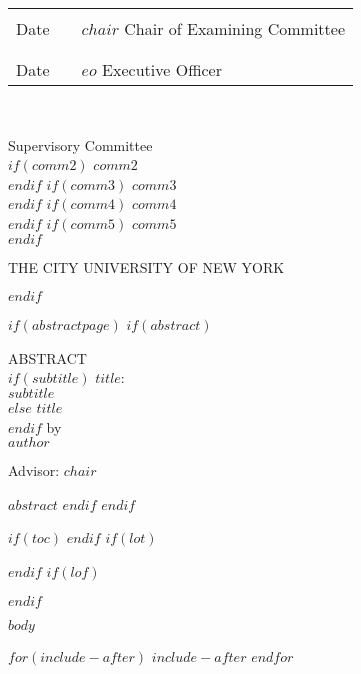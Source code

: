 \documentclass[$if(draft)$$draft$,$endif$$if(fontsize)$$fontsize$,$endif$$if(lang)$$babel-lang$,$endif$$if(papersize)$$papersize$,$endif$$if(sides)$$sides$,$endif$$for(classoption)$$classoption$$sep$,$endfor$]{$documentclass$}
\newcounter{savepage}
\begin{document}
\vspace{0.75in}

\setlength{\tabcolsep}{0pt}
\hspace*{-0.5in}
\doublespacing
\begin{tabular}[t]{p{1.75in}p{1.0in}p{3.5in}}
\hrulefill& &\hrulefill \\
Date & & $chair$ \newline Chair of Examining Committee\\
\\
\hrulefill& &\hrulefill \\
Date & & $eo$ \newline Executive Officer\\
\end{tabular}\\[0.5in]

\begin{center}
\doublespacing
Supervisory Committee \\
$if(comm2)$
  $comm2$ \\
$endif$
$if(comm3)$
  $comm3$ \\
$endif$
$if(comm4)$
  $comm4$ \\
$endif$
$if(comm5)$
  $comm5$ \\
$endif$

\vspace{\fill}
\uppercase{The City University of New York}
\end{center}
$endif$

$if(abstractpage)$
$if(abstract)$
\newpage
{}
\label{chap:abstract}
\begin{center}%
  \singlespacing
  ABSTRACT \\[2em]
  $if(subtitle)$
  $title$:\\
  $subtitle$\\[1em]
  $else$
  $title$\\[1em]
  $endif$
  by \\[1em]
  $author$ \\[0.25in]
\end{center}
\vspace{0.25in}
\noindent Advisor: $chair$
\vspace{0.25in}

$abstract$
$endif$
$endif$

$if(toc)$
\newpage
{\hypersetup{linkcolor=$if(toccolor)$$toccolor$$else$black$endif$}
\setcounter{tocdepth}{$toc-depth$}
\renewcommand{\contentsname}{Table of Contents}
\singlespacing
\tableofcontents}
$endif$
$if(lot)$
\newpage
{}
\label{chap:list-of-tables}
\listoftables
$endif$
$if(lof)$
\newpage
{}
\label{chap:list-of-figures}
\listoffigures
$endif$

\setcounter{savepage}{\number\value{page}}

\mainmatter

$body$

$for(include-after)$
$include-after$
$endfor$
\end{document}
